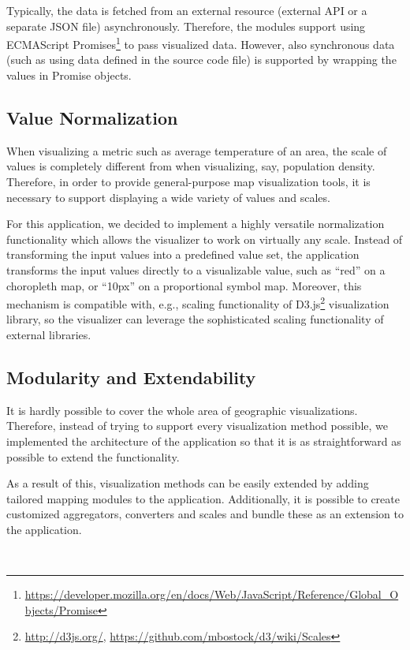 Typically, the data is fetched from an external resource (external API or a separate JSON file) asynchronously. Therefore, the modules support using ECMAScript Promises\footnote{\url{https://developer.mozilla.org/en/docs/Web/JavaScript/Reference/Global_Objects/Promise}} to pass visualized data. However, also synchronous data (such as using data defined in the source code file) is supported by wrapping the values in Promise objects.

\subsection{Value Normalization}

When visualizing a metric such as average temperature of an area, the scale of values is completely different from when visualizing, say, population density. Therefore, in order to provide general-purpose map visualization tools, it is necessary to support displaying a wide variety of values and scales.

For this application, we decided to implement a highly versatile normalization functionality which allows the visualizer to work on virtually any scale. Instead of transforming the input values into a predefined value set, the application transforms the input values directly to a visualizable value, such as ``red'' on a choropleth map, or ``10px'' on a proportional symbol map. Moreover, this mechanism is compatible with, e.g., scaling functionality of D3.js\footnote{\url{http://d3js.org/}, \url{https://github.com/mbostock/d3/wiki/Scales}} visualization library, so the visualizer can leverage the sophisticated scaling functionality of external libraries.

\subsection{Modularity and Extendability}

It is hardly possible to cover the whole area of geographic visualizations. Therefore, instead of trying to support every visualization method possible, we implemented the architecture of the application so that it is as straightforward as possible to extend the functionality.

As a result of this, visualization methods can be easily extended by adding tailored mapping modules to the application. Additionally, it is possible to create customized aggregators, converters and scales and bundle these as an extension to the application.

~

